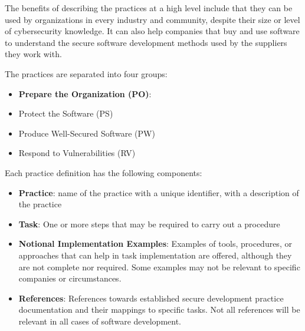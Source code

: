 The benefits of describing the practices at a high level include that they can be used by organizations in every industry and community, despite their size or level of cybersecurity knowledge. It can also help companies that buy and use software to understand the secure software development methods used by the suppliers they work with. 

The practices are separated into four groups:
\begin{itemize}
  \item \textbf{Prepare the Organization (PO)}:   
  
  \item Protect the Software (PS)
  \item Produce Well-Secured Software (PW)
  \item Respond to Vulnerabilities (RV)
\end{itemize}

Each practice definition has the following components:
\begin{itemize}
  \item \textbf{Practice}: name of the practice with a unique identifier, with a description of the practice 
  \item \textbf{Task}: One or more steps that may be required to carry out a procedure
  \item \textbf{Notional Implementation Examples}: Examples of tools, procedures, or approaches that can help in task implementation are offered, although they are not complete nor required. Some examples may not be relevant to specific companies or circumstances.
  \item \textbf{References}: References towards established secure development practice documentation and their mappings to specific tasks. Not all references will be relevant in all cases of software development. \cite{ssdf}
\end{itemize}




